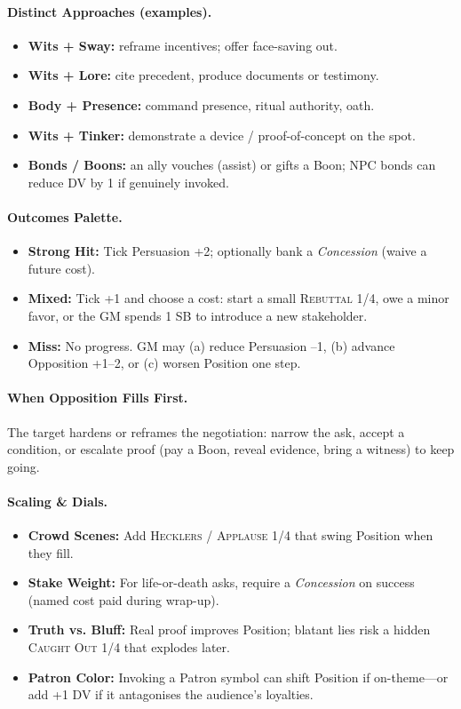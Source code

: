 \paragraph{Distinct Approaches (examples).}
\begin{itemize}
    \item \textbf{Wits + Sway:} reframe incentives; offer face-saving out.
    \item \textbf{Wits + Lore:} cite precedent, produce documents or testimony.
    \item \textbf{Body + Presence:} command presence, ritual authority, oath.
    \item \textbf{Wits + Tinker:} demonstrate a device / proof-of-concept on the spot.
    \item \textbf{Bonds / Boons:} an ally vouches (assist) or gifts a Boon; NPC bonds can reduce DV by 1 if genuinely invoked.
\end{itemize}

\paragraph{Outcomes Palette.}
\begin{itemize}
    \item \textbf{Strong Hit:} Tick Persuasion +2; optionally bank a \emph{Concession} (waive a future cost).
    \item \textbf{Mixed:} Tick +1 and choose a cost: start a small \textsc{Rebuttal 1/4}, owe a minor favor, or the GM spends 1 SB to introduce a new stakeholder.
    \item \textbf{Miss:} No progress. GM may (a) reduce Persuasion --1, (b) advance Opposition +1--2, or (c) worsen Position one step.
\end{itemize}

\paragraph{When Opposition Fills First.}
The target hardens or reframes the negotiation: narrow the ask, accept a condition, or escalate proof (pay a Boon, reveal evidence, bring a witness) to keep going.

\paragraph{Scaling \& Dials.}
\begin{itemize}
    \item \textbf{Crowd Scenes:} Add \textsc{Hecklers} / \textsc{Applause} 1/4 that swing Position when they fill.
    \item \textbf{Stake Weight:} For life-or-death asks, require a \emph{Concession} on success (named cost paid during wrap-up).
    \item \textbf{Truth vs. Bluff:} Real proof improves Position; blatant lies risk a hidden \textsc{Caught Out} 1/4 that explodes later.
    \item \textbf{Patron Color:} Invoking a Patron symbol can shift Position if on-theme---or add +1 DV if it antagonises the audience's loyalties.
\end{itemize}

